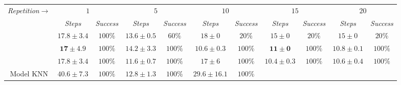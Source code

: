 \begin{table}[t]
  \centering
  {\scriptsize
  \setlength\tabcolsep{3pt}
  \begin{tabular}{|c|c|c|c|c|c|c|c|c|c|c|}
    \hline
    \textit{Repetition$\rightarrow$} & \multicolumn{2}{c|}{${1}$} &
                                                                  \multicolumn{2}{c|}{${5}$} & \multicolumn{2}{c|}{${10}$} & \multicolumn{2}{c|}{${15}$} & \multicolumn{2}{c|}{${20}$} \\
    \cline{2-11}
    & \textit{Steps} & \textit{Success} & \textit{Steps} & \textit{Success} & \textit{Steps} & \textit{Success} &
                                                                     \textit{Steps}
                         & \textit{Success} &
                                                       \textit{Steps} & \textit{Success} \\
    \hline
    \cmax{} & $\mathbf{17.8 \pm 3.4}$ & $100\%$& $13.6 \pm 0.5$ & $60\%$ & $18 \pm
                                                     0$ & $20\%$ & $15
                                                                   \pm
                                                                   0$
                         & $20\%$ &
    $15 \pm 0$ & $20\%$\\
    \hline
    \cmaxpp{} & $\mathbf{17 \pm 4.9}$ & $100\%$ & $14.2 \pm 3.3$ &
                                                                   $100\%$
                                                                                                                                                   & $\mathbf{10.6 \pm 0.3}$ & $100\%$
                                  & $\mathbf{11 \pm 0}$ &  $100\%$ & $\mathbf{10.8 \pm
                                                            0.1}$ & $100\%$ \\
    \hline
    \acmaxpp{} & $\mathbf{17.8 \pm 3.4}$ & $100\%$ & $\mathbf{11.6 \pm 0.7}$ &
                                                                      $100\%$
                                                                                                                                                   & $17 \pm 6$ & $100\%$
                                  & $\mathbf{10.4 \pm 0.3}$ & $100\%$ & $\mathbf{10.6
                                                               \pm
                                                               0.4}$ & $100\%$ \\
    \hline
    Model KNN & $40.6 \pm 7.3$ & $100\%$ & $12.8 \pm 1.3$ & $100\%$ & $29.6 \pm
                                                      16.1$ & $100\%$ &

\end{tabular}}
\end{table}
